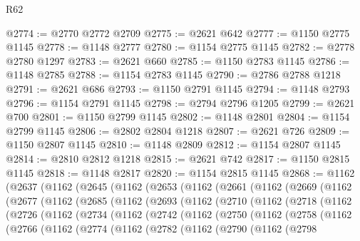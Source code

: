 \begin{lexlean}{R62}
\begin{coremodule}
@2774 := @2770 @2772 @2709
@2775 := @2621 @642
@2777 := @1150 @2775 @1145
@2778 := @1148 @2777
@2780 := @1154 @2775 @1145
@2782 := @2778 @2780 @1297
@2783 := @2621 @660
@2785 := @1150 @2783 @1145
@2786 := @1148 @2785
@2788 := @1154 @2783 @1145
@2790 := @2786 @2788 @1218
@2791 := @2621 @686
@2793 := @1150 @2791 @1145
@2794 := @1148 @2793
@2796 := @1154 @2791 @1145
@2798 := @2794 @2796 @1205
@2799 := @2621 @700
@2801 := @1150 @2799 @1145
@2802 := @1148 @2801
@2804 := @1154 @2799 @1145
@2806 := @2802 @2804 @1218
@2807 := @2621 @726
@2809 := @1150 @2807 @1145
@2810 := @1148 @2809
@2812 := @1154 @2807 @1145
@2814 := @2810 @2812 @1218
@2815 := @2621 @742
@2817 := @1150 @2815 @1145
@2818 := @1148 @2817
@2820 := @1154 @2815 @1145
@2868 := @1162
    (@2637
      (@1162
        (@2645
          (@1162
            (@2653
              (@1162
                (@2661
                  (@1162
                    (@2669
                      (@1162
                        (@2677
                          (@1162
                            (@2685
                              (@1162
                                (@2693
                                  (@1162
                                    (@2710
                                      (@1162
                                        (@2718
                                          (@1162
                                            (@2726
                                              (@1162
                                                (@2734
                                                  (@1162
                                                    (@2742
                                                      (@1162
                                                        (@2750
                                                          (@1162
                                                            (@2758
                                                              (@1162
                                                                (@2766
                                                                  (@1162
                                                                    (@2774
                                                                      (@1162
                                                                        (@2782
                                                                          (@1162
                                                                            (@2790
                                                                              (@1162
                                                                                (@2798

\end{coremodule}
\end{lexlean}
